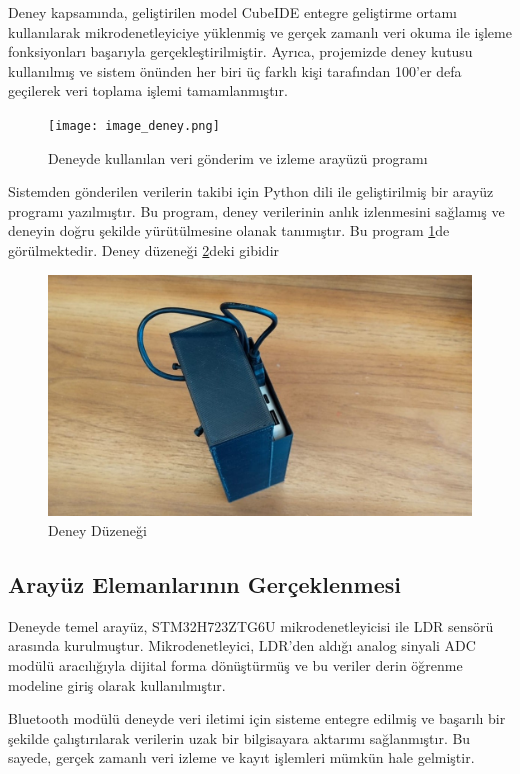 Deney kapsamında, geliştirilen model CubeIDE entegre geliştirme ortamı kullanılarak mikrodenetleyiciye yüklenmiş ve gerçek zamanlı veri okuma ile işleme fonksiyonları başarıyla gerçekleştirilmiştir. Ayrıca, projemizde deney kutusu kullanılmış ve sistem önünden her biri üç farklı kişi tarafından 100'er defa geçilerek veri toplama işlemi tamamlanmıştır.


\begin{figure}[H]
    \centering
    \texttt{[image: image\_deney.png]}
    \caption{Deneyde kullanılan veri gönderim ve izleme arayüzü programı}
    \label{fig:deney_arayuz}
\end{figure}

\newpage

Sistemden gönderilen verilerin takibi için Python dili ile geliştirilmiş bir arayüz programı yazılmıştır. Bu program, deney verilerinin anlık izlenmesini sağlamış ve deneyin doğru şekilde yürütülmesine olanak tanımıştır. Bu program \ref{fig:deney_arayuz}de görülmektedir. Deney düzeneği \ref{fig:deney_kutu}deki gibidir

\begin{figure}[H]
    \centering
    \includegraphics[width=0.75\linewidth]{media/deney_kutu1.jpg}
    \caption{Deney Düzeneği}
    \label{fig:deney_kutu}
\end{figure}



\subsection{Arayüz Elemanlarının Gerçeklenmesi}
Deneyde temel arayüz, STM32H723ZTG6U mikrodenetleyicisi ile LDR sensörü arasında kurulmuştur. Mikrodenetleyici, LDR’den aldığı analog sinyali ADC modülü aracılığıyla dijital forma dönüştürmüş ve bu veriler derin öğrenme modeline giriş olarak kullanılmıştır.

Bluetooth modülü deneyde veri iletimi için sisteme entegre edilmiş ve başarılı bir şekilde çalıştırılarak verilerin uzak bir bilgisayara aktarımı sağlanmıştır. Bu sayede, gerçek zamanlı veri izleme ve kayıt işlemleri mümkün hale gelmiştir.

